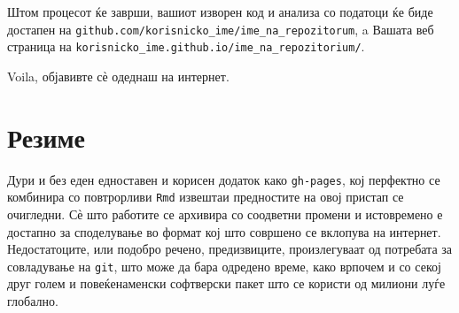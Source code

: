 \documentclass[
]{book}
\begin{document}
Штом процесот ќе заврши, вашиот изворен код и анализа со податоци ќе биде достапен на \texttt{github.com/korisnicko\_ime/ime\_na\_repozitorum}, a Вашата веб страница на \texttt{korisnicko\_ime.github.io/ime\_na\_repozitorium/}.

Voila, објавивте сѐ одеднаш на интернет.

\hypertarget{ux440ux435ux437ux438ux43cux435-5}{%
\section{Резиме}\label{ux440ux435ux437ux438ux43cux435-5}}

Дури и без еден едноставен и корисен додаток како \texttt{gh-pages}, кој перфектно се комбинира со повтрорливи \texttt{Rmd} извештаи предностите на овој пристап се очигледни. Сѐ што работите се архивира со соодветни промени и истовремено е достапно за споделување во формат кој што совршено се вклопува на интернет. Недостатоците, или подобро речено, предизвиците, произлегуваат од потребата за совладување на \texttt{git}, што може да бара одредено време, како врпочем и со секој друг голем и повеќенаменски софтверски пакет што се користи од милиони луѓе глобално.

  
\end{document}

